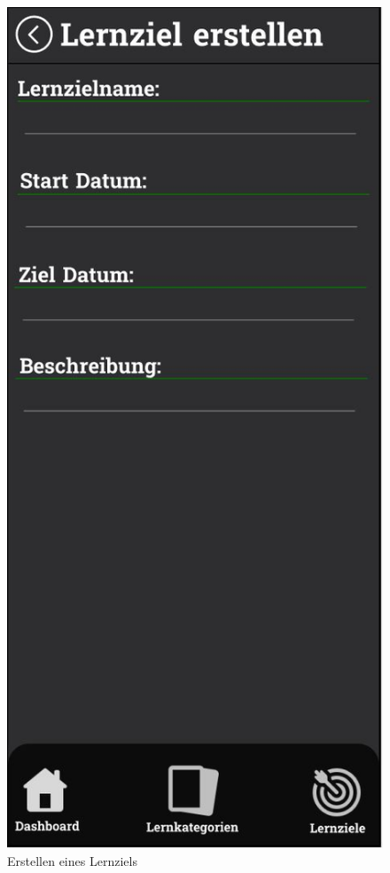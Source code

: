 \newpage

\begin{figure}[H]
  \centering
  \includegraphics[width=0.5\linewidth]{images/Mockups/LernzielErstellen.JPG}
  \caption{Erstellen eines Lernziels}
  \label{fig:lernziel-erstellen}
\end{figure}

\newpage

